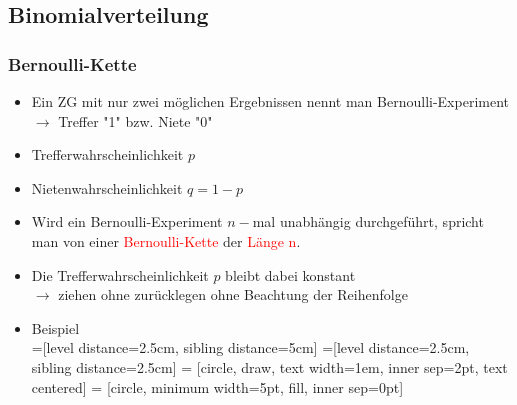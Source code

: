 \documentclass[a4paper,twocolumn,10pt]{onepgnote1}
\begin{document}
\subsection{Binomialverteilung}
\subsubsection{Bernoulli-Kette}
\begin{itemize}
    \item Ein ZG mit nur zwei möglichen Ergebnissen nennt man Bernoulli-Experiment $ \longrightarrow$ Treffer "1" bzw. Niete "0"
    \item Trefferwahrscheinlichkeit $p$
    \item Nietenwahrscheinlichkeit $q = 1-p$
    \item Wird ein Bernoulli-Experiment $n-$mal unabhängig durchgeführt, spricht man von einer \textcolor{red}{Bernoulli-Kette} der \textcolor{red}{Länge n}. 
    \item Die Trefferwahrscheinlichkeit $p$ bleibt dabei konstant \\$\longrightarrow$ ziehen ohne zurücklegen ohne Beachtung der Reihenfolge
    \item Beispiel\\
=[level distance=2.5cm, sibling distance=5cm]
=[level distance=2.5cm, sibling distance=2.5cm]
 = [circle, draw, text width=1em, inner sep=2pt, text centered]
 = [circle, minimum width=5pt, fill, inner sep=0pt]
\end{itemize}
\end{document}
